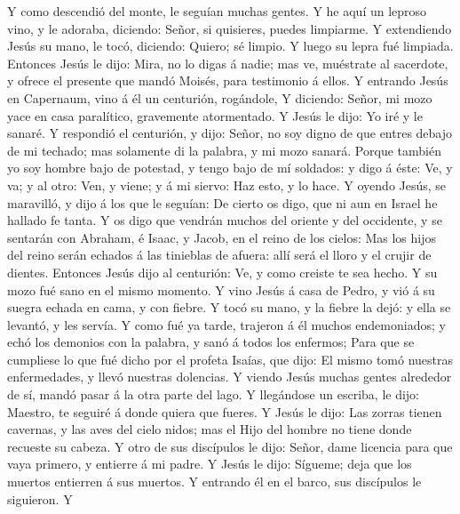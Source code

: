  Y como descendió del monte, le seguían muchas gentes.
 Y he aquí un leproso vino, y le adoraba, diciendo: Señor,
si quisieres, puedes limpiarme.  Y extendiendo Jesús su
mano, le tocó, diciendo: Quiero; sé limpio. Y luego su lepra fué
limpiada.  Entonces Jesús le dijo: Mira, no lo digas á
nadie; mas ve, muéstrate al sacerdote, y ofrece el presente que mandó
Moisés, para testimonio á ellos.  Y entrando Jesús en
Capernaum, vino á él un centurión, rogándole,  Y diciendo:
Señor, mi mozo yace en casa paralítico, gravemente atormentado.
 Y Jesús le dijo: Yo iré y le sanaré.  Y
respondió el centurión, y dijo: Señor, no soy digno de que entres debajo
de mi techado; mas solamente di la palabra, y mi mozo sanará.
 Porque también yo soy hombre bajo de potestad, y tengo
bajo de mí soldados: y digo á éste: Ve, y va; y al otro: Ven, y viene; y
á mi siervo: Haz esto, y lo hace.  Y oyendo Jesús, se
maravilló, y dijo á los que le seguían: De cierto os digo, que ni aun en
Israel he hallado fe tanta.  Y os digo que vendrán muchos
del oriente y del occidente, y se sentarán con Abraham, é Isaac, y
Jacob, en el reino de los cielos:  Mas los hijos del
reino serán echados á las tinieblas de afuera: allí será el lloro y el
crujir de dientes.  Entonces Jesús dijo al centurión: Ve,
y como creiste te sea hecho. Y su mozo fué sano en el mismo momento.
 Y vino Jesús á casa de Pedro, y vió á su suegra echada
en cama, y con fiebre.  Y tocó su mano, y la fiebre la
dejó: y ella se levantó, y les servía.  Y como fué ya
tarde, trajeron á él muchos endemoniados; y echó los demonios con la
palabra, y sanó á todos los enfermos;  Para que se
cumpliese lo que fué dicho por el profeta Isaías, que dijo: El mismo
tomó nuestras enfermedades, y llevó nuestras dolencias. 
Y viendo Jesús muchas gentes alrededor de sí, mandó pasar á la otra
parte del lago.  Y llegándose un escriba, le dijo:
Maestro, te seguiré á donde quiera que fueres.  Y Jesús
le dijo: Las zorras tienen cavernas, y las aves del cielo nidos; mas el
Hijo del hombre no tiene donde recueste su cabeza.  Y
otro de sus discípulos le dijo: Señor, dame licencia para que vaya
primero, y entierre á mi padre.  Y Jesús le dijo:
Sígueme; deja que los muertos entierren á sus muertos.  Y
entrando él en el barco, sus discípulos le siguieron.  Y
